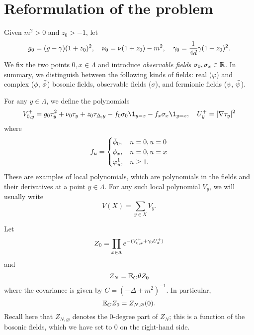 \section{Reformulation of the problem}

Given $m^2>0$ and $z_0 >-1$, let
\begin{equation}
\label{e:gg0}
g_0 = (g - \gamma) (1 + z_0)^2,
	\quad
\nu_0 = \nu (1 + z_0) - m^2,
	\quad
\gamma_0 = \frac{1}{4d} \gamma (1 + z_0)^2.
\end{equation}
We fix the two points $0,x\in \Lambda$
and introduce \emph{observable fields} $\sigma_0, \sigma_x \in {\mathbb R}$.
In summary, we distinguish between the following kinds of fields:
real ($\varphi$) and complex ($\phi$, $\bar\phi$) bosonic fields,
observable fields ($\sigma$), and fermionic fields ($\psi$, $\bar\psi$).

For any $y\in\Lambda$, we define the polynomials
\begin{equation}
\label{e:V0def}
\Vp^+_{0,y}
	=
g_0\tau_y^2 + \nu_0 \tau_y + z_0 \tau_{\Delta,y}
- f_0 \sigma_0 \1_{y=x}
- f_x \sigma_x \1_{y=x},
	\quad
U^+_y
	=
|\nabla \tau_y|^2
\end{equation}
where
\begin{equation}
\label{e:obs-couple}
f_u =
\begin{cases}
\bar\phi_0,		& n = 0, u = 0 \\
\phi_x,			& n = 0, u = x \\
\varphi^1_u,	& n \ge 1.
\end{cases}
\end{equation}
These are examples of local polynomials, which are polynomials
in the fields and their derivatives at a point $y\in\Lambda$. For any such local
polynomial $V_y$, we will usually write
\begin{equation}
\label{e:VX}
V(X) = \sum_{y\in X} V_y.
\end{equation}

Let
\begin{equation}
\label{e:Z0def}
Z_0 = \prod_{x\in \Lambda} e^{-(V^+_{0,x} + \gamma_0 U^+_x)}
\end{equation}
and
\begin{equation}
\label{e:ZNdef}
Z_N = \mathbb{E}_C \theta Z_0
\end{equation}
where the covariance is given by $C = (-\Delta + m^2)^{-1}$.
In particular,
\begin{equation}
\label{e:exp-conv}
\mathbb{E}_C Z_0 = Z_{N,\varnothing}(0).
\end{equation}
Recall here that $Z_{N,\varnothing}$ denotes the $0$-degree part of $Z_N$;
this is a function of the bosonic fields, which we have set to $0$ on the
right-hand side.

